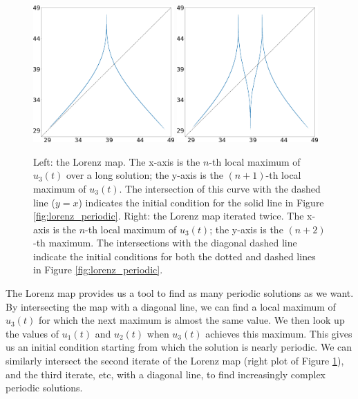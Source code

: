 \documentclass[preprint,12pt]{elsarticle}
\begin{document}
\begin{figure}\centering
\includegraphics[width=0.48\textwidth]{lorenz_zmax_10_28_2.6666666666666665.png}
\hspace{0.02\textwidth}
\includegraphics[width=0.48\textwidth]{lorenz_zmax2_10_28_2.6666666666666665.png}
\caption{Left: the Lorenz map.  The x-axis is the $n$-th local maximum of $u_3(t)$ over a
long solution; the y-axis is the $(n+1)$-th local maximum of $u_3(t)$.  The intersection of this curve
		with the dashed line ($y=x$) indicates the initial condition for the solid line
in Figure \ref{fig:lorenz_periodic}.
Right: the Lorenz map iterated twice.  The x-axis is the $n$-th local maximum
of $u_3(t)$; the y-axis is the $(n+2)$-th maximum.  The intersections with the diagonal dashed
line indicate the initial conditions for both the dotted and dashed lines in
Figure \ref{fig:lorenz_periodic}.}
\label{fig:lorenz_map}
\end{figure}
The Lorenz map provides us a tool to find as many periodic solutions as we want.
By intersecting the map with a diagonal line, we can find a local maximum of $u_3(t)$
for which the next maximum is almost the same value.  We then look up the values of
$u_1(t)$ and $u_2(t)$ when $u_3(t)$ achieves this maximum.  This gives us an initial
condition starting from which the solution is nearly periodic.   We can similarly
intersect the second iterate of the Lorenz map (right plot of Figure \ref{fig:lorenz_map}),
and the third iterate, etc, with a diagonal line, to find increasingly
complex periodic solutions. 
\end{document}
